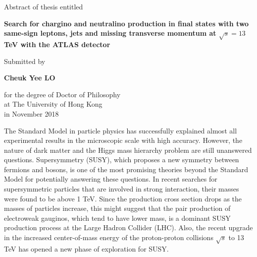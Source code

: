 {}

\begin{center}

Abstract of thesis entitled\\

\bigskip

    \huge\textbf{Search for chargino and neutralino production in final states with two same-sign leptons, jets and missing transverse momentum at $\sqrt{s} = 13$ TeV with the ATLAS detector} \\

    \bigskip

    {\normalsize Submitted by}\\

\bigskip

    \Large{\textbf{Cheuk Yee LO}}\\

\bigskip

{\normalsize
for the degree of Doctor of Philosophy\\
at The University of Hong Kong\\
in November 2018\\}

\end{center}

\bigskip

The Standard Model in particle physics has successfully explained almost all experimental results in the microscopic scale with high accuracy.
However, the nature of dark matter and the Higgs mass hierarchy problem are still unanswered questions.
Supersymmetry (SUSY), which proposes a new symmetry between fermions and bosons, is one of the most promising theories beyond the Standard Model for potentially answering these questions.
In recent searches for supersymmetric particles that are involved in strong interaction, their masses were found to be above 1 TeV.
Since the production cross section drops as the masses of particles increase,
this might suggest that the pair production of electroweak gauginos, which tend to have lower mass, is a dominant SUSY production process at the Large Hadron Collider (LHC).
Also, the recent upgrade in the increased center-of-mass energy of the proton-proton collisions $\sqrt{s}$ to 13 TeV has opened a new phase of exploration for SUSY.

